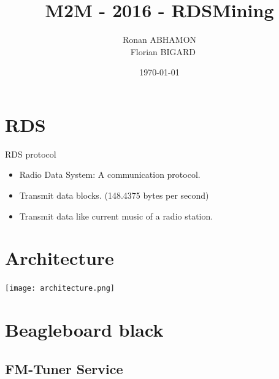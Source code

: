 \documentclass{beamer}
\title{M2M - 2016 - RDSMining}
\author{Ronan ABHAMON \\~ Florian BIGARD}
\institute{Université Joseph Fourier}
\date{\today}
\begin{document}
\begin{frame}
	\titlepage
\end{frame}

\section{RDS}
\begin{frame}
	\begin{block}{RDS protocol}
		\begin{itemize}
			\item Radio Data System: A communication protocol.
			\item Transmit data blocks. (148.4375 bytes per second)
			\item Transmit data like current music of a radio station.
		\end{itemize}
	\end{block}
\end{frame}

\section{Architecture}
\begin{frame}
	\begin{center}
		\texttt{[image: architecture.png]}
	\end{center}
\end{frame}

\section{Beagleboard black}

\subsection{FM-Tuner Service}
\end{document}
